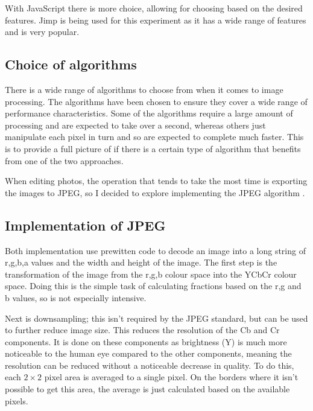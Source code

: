 \documentclass[12pt,a4paper]{article}
\begin{document}
With JavaScript there is more choice, allowing for choosing based on the desired features. Jimp is being used for this experiment as it has a wide range of features and is very popular.




\subsection{Choice of algorithms}

There is a wide range of algorithms to choose from when it comes to image processing. The algorithms have been chosen to ensure they cover a wide range of performance characteristics. Some of the algorithms require a large amount of processing and are expected to take over a second, whereas others just manipulate each pixel in turn and so are expected to complete much faster. This is to provide a full picture of if there is a certain type of algorithm that benefits from one of the two approaches.

When editing photos, the operation that tends to take the most time is exporting the images to JPEG, so I decided to explore implementing the JPEG algorithm \cite{jpeg}.

\subsection{Implementation of JPEG}


Both implementation use prewitten code to decode an image into a long string of r,g,b,a values and the width and height of the image. The first step is the transformation of the image from the r,g,b colour space into the YCbCr colour space. Doing this is the simple task of calculating fractions based on the r,g and b values, so is not especially intensive.

Next is downsampling; this isn't required by the JPEG standard, but can be used to further reduce image size. This reduces the resolution of the Cb and Cr components. It is done on these components as brightness (Y) is much more noticeable to the human eye compared to the other components, meaning the resolution can be reduced without a noticeable decrease in quality. To do this, each $2\times 2$ pixel area is averaged to a single pixel. On the borders where it isn't possible to get this area, the average is just calculated based on the available pixels.
\end{document}

